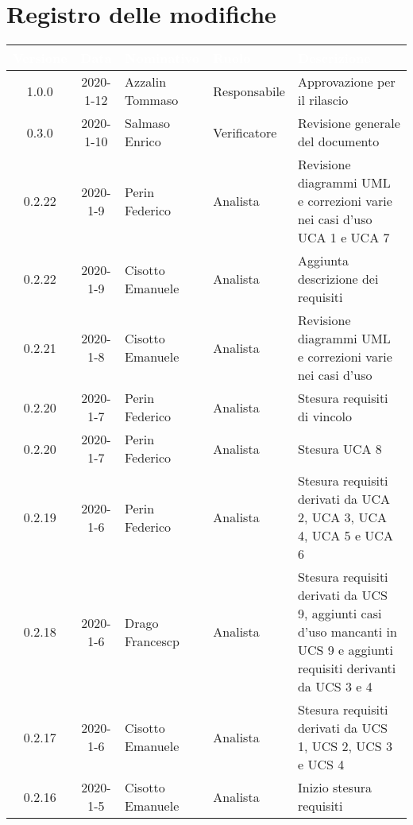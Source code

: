 \section*{Registro delle modifiche}
{
\renewcommand{\arraystretch}{1.5}
\centering
\begin{longtable}{ c c  C{4cm}  C{3cm} C{4cm}}
   \textcolor{white}{\textbf{Versione}} &
   \textcolor{white}{\textbf{Data}}&
   \textcolor{white}{\textbf{Nominativo}}&
   \textcolor{white}{\textbf{Ruolo}}&
   \textcolor{white}{\textbf{Descrizione}}\\
   \endhead


1.0.0 & 2020-1-12 & Azzalin Tommaso & Responsabile & Approvazione per il rilascio \\

0.3.0 & 2020-1-10 & Salmaso Enrico & Verificatore & Revisione generale del documento\\

0.2.22 & 2020-1-9 & Perin Federico & Analista & Revisione diagrammi UML e correzioni varie nei casi d'uso UCA 1 e UCA 7 \\

0.2.22 & 2020-1-9 & Cisotto Emanuele & Analista & Aggiunta descrizione dei requisiti \\

0.2.21 & 2020-1-8 & Cisotto Emanuele & Analista & Revisione diagrammi UML e correzioni varie nei casi d'uso \\

0.2.20 & 2020-1-7 & Perin Federico & Analista & Stesura requisiti di vincolo\\

0.2.20 & 2020-1-7 & Perin Federico & Analista & Stesura UCA 8\\

0.2.19 & 2020-1-6 & Perin Federico & Analista & Stesura requisiti derivati da UCA 2, UCA 3, UCA 4, UCA 5 e UCA 6\\

0.2.18 & 2020-1-6 & Drago Francescp & Analista & Stesura requisiti derivati da UCS 9, aggiunti casi d'uso mancanti in UCS 9 e aggiunti requisiti derivanti da UCS 3 e 4 \\

0.2.17 & 2020-1-6 & Cisotto Emanuele & Analista & Stesura requisiti derivati da UCS 1, UCS 2, UCS 3 e UCS 4 \\

0.2.16 & 2020-1-5 & Cisotto Emanuele & Analista & Inizio stesura requisiti \\


\end{longtable}}
